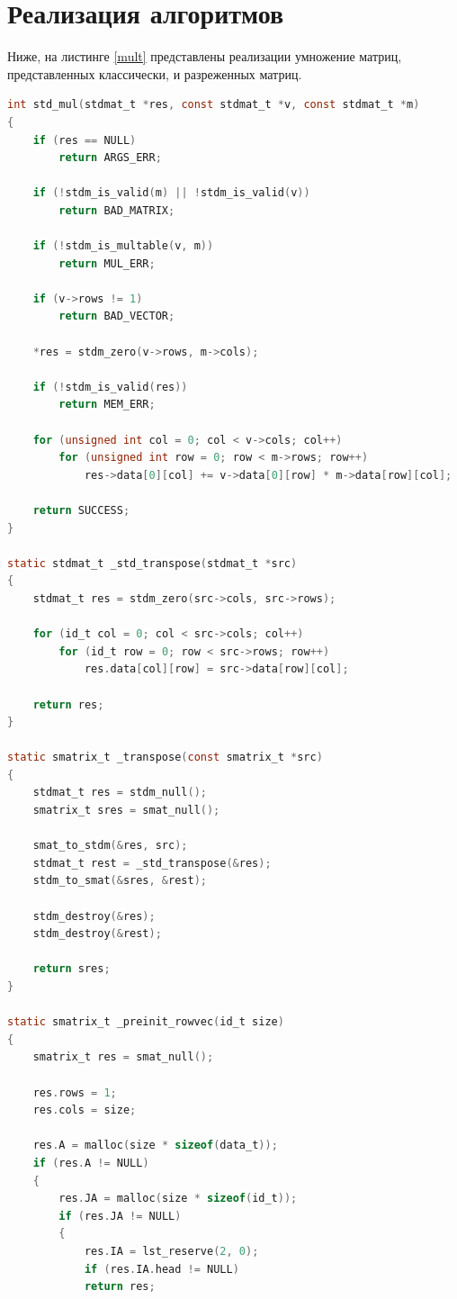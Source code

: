 \section{Реализация алгоритмов}

Ниже, на листинге \ref{mult} представлены реализации умножение матриц, представленных классически, и разреженных матриц.

\begin{lstlisting}[label=mult,language=C,caption=Реализация умножения матриц]
int std_mul(stdmat_t *res, const stdmat_t *v, const stdmat_t *m)
{
	if (res == NULL)
		return ARGS_ERR;
	
	if (!stdm_is_valid(m) || !stdm_is_valid(v))
		return BAD_MATRIX;
	
	if (!stdm_is_multable(v, m))
		return MUL_ERR;
	
	if (v->rows != 1)
		return BAD_VECTOR;
	
	*res = stdm_zero(v->rows, m->cols);
	
	if (!stdm_is_valid(res))
		return MEM_ERR;
	
	for (unsigned int col = 0; col < v->cols; col++)
		for (unsigned int row = 0; row < m->rows; row++)
			res->data[0][col] += v->data[0][row] * m->data[row][col];
	
	return SUCCESS;
}

static stdmat_t _std_transpose(stdmat_t *src)
{
	stdmat_t res = stdm_zero(src->cols, src->rows);
	
	for (id_t col = 0; col < src->cols; col++)
		for (id_t row = 0; row < src->rows; row++)
			res.data[col][row] = src->data[row][col];
	
	return res;
}

static smatrix_t _transpose(const smatrix_t *src)
{
	stdmat_t res = stdm_null();
	smatrix_t sres = smat_null();
	
    smat_to_stdm(&res, src);
	stdmat_t rest = _std_transpose(&res);
	stdm_to_smat(&sres, &rest);
	
	stdm_destroy(&res);
	stdm_destroy(&rest);
	
	return sres;
}

static smatrix_t _preinit_rowvec(id_t size)
{
	smatrix_t res = smat_null();
	
	res.rows = 1;
	res.cols = size;
	
	res.A = malloc(size * sizeof(data_t));
	if (res.A != NULL)
	{
		res.JA = malloc(size * sizeof(id_t));
		if (res.JA != NULL)
		{
			res.IA = lst_reserve(2, 0);
			if (res.IA.head != NULL)
			return res;
			

\end{lstlisting}
